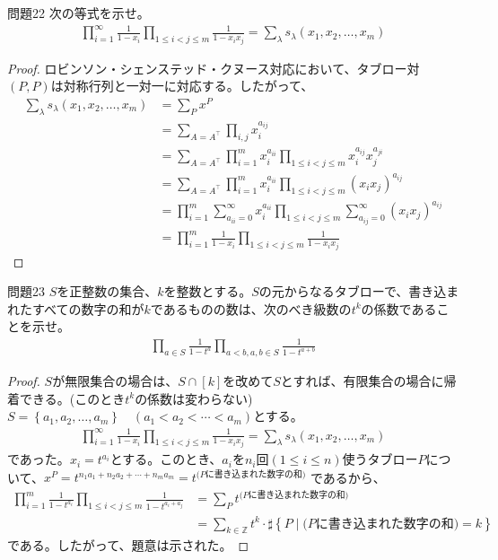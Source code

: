 \documentclass[a4paper,11pt]{jsarticle}
\theoremstyle{plain}
\theoremstyle{definition}
\renewcommand{\(}{\left(}
\renewcommand{\)}{\right)}
\renewcommand{\[}{\left[}
\renewcommand{\]}{\right]}
\renewcommand{\{}{\left\lbrace}
\renewcommand{\}}{\right\rbrace}
\newcommand{\Z}{\mathbb{Z}}
\begin{document}
\begin{itembox}[l]{問題22}
    次の等式を示せ。
    \begin{align*}
        \prod_{i=1}^{\infty} \frac{1}{1-x_i} \prod_{1 \leq i < j \leq m} \frac{1}{1-x_i x_j} = \sum_{\lambda} s_{\lambda}(x_1, x_2, \ldots, x_m)
    \end{align*}
\end{itembox}

\begin{proof}
    ロビンソン・シェンステッド・クヌース対応において、タブロー対$(P,P)$は対称行列と一対一に対応する。したがって、
    \begin{align*}
        \sum_{\lambda} s_{\lambda}(x_1, x_2, \ldots, x_m) &= \sum_{P} x^P \\
        &= \sum_{A = A^{\top}} \prod_{i,j} x_i^{a_{ij}} \\
        &= \sum_{A = A^{\top}} \prod_{i=1}^{m} x_i^{a_{ii}} \prod_{1 \leq i < j \leq m} x_i^{a_{ij}} x_j^{a_{ji}} \\
        &= \sum_{A = A^{\top}} \prod_{i=1}^{m} x_i^{a_{ii}} \prod_{1 \leq i < j \leq m} (x_i x_j)^{a_{ij}} \\
        &= \prod_{i=1}^{m} \sum_{a_{ii}=0}^{\infty} x_i^{a_{ii}} \prod_{1 \leq i < j \leq m} \sum_{a_{ij}=0}^{\infty} (x_i x_j)^{a_{ij}} \\
        &= \prod_{i=1}^{m} \frac{1}{1-x_i} \prod_{1 \leq i < j \leq m} \frac{1}{1-x_i x_j}
    \end{align*}
\end{proof}

\begin{itembox}[l]{問題23}
    $S$を正整数の集合、$k$を整数とする。$S$の元からなるタブローで、書き込まれたすべての数字の和が$k$であるものの数は、次のべき級数の$t^k$の係数であることを示せ。
    \begin{align*}
        \prod_{a \in S} \frac{1}{1-t^a} \prod_{a<b, a,b \in S} \frac{1}{1-t^{a+b}}
    \end{align*}
\end{itembox}

\begin{proof}
    $S$が無限集合の場合は、$S\cap [k]$を改めて$S$とすれば、有限集合の場合に帰着できる。(このとき$t^k$の係数は変わらない)
    $S=\{a_1, a_2, \ldots, a_m\} \quad (a_1 < a_2 < \cdots < a_m)$とする。
    \begin{align*}
        \prod_{i=1}^{\infty} \frac{1}{1-x_i} \prod_{1 \leq i < j \leq m} \frac{1}{1-x_i x_j} = \sum_{\lambda} s_{\lambda}(x_1, x_2, \ldots, x_m)
    \end{align*}
    であった。$x_i = t^{a_i}$とする。このとき、$a_i$を$n_i$回$(1\leq i \leq n)$使うタブロー$P$について、$x^P = t^{n_1 a_1 + n_2 a_2 + \cdots + n_m a_m} = t^{\text{($P$に書き込まれた数字の和)}}$
    であるから、
    \begin{align*}
        \prod_{i=1}^{m} \frac{1}{1-t^{a_i}} \prod_{1 \leq i < j \leq m} \frac{1}{1-t^{a_i + a_j}} &= \sum_{P} t^{\text{($P$に書き込まれた数字の和)}} \\
        &= \sum_{k\in \Z} t^k \cdot \sharp \{ P \mid \text{($P$に書き込まれた数字の和)} = k \}
    \end{align*}
    である。したがって、題意は示された。
\end{proof}
\end{document}
